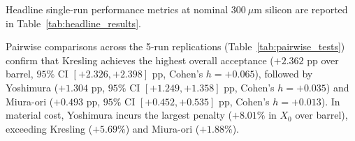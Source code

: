 \documentclass[a4paper,11pt]{article}
\begin{document}
Headline single-run performance metrics at nominal $300\ \mu\text{m}$ silicon are reported in Table~\ref{tab:headline_results}.

\begin{table}[!htbp]
\centering
\caption{Single-run exploratory performance metrics for candidate geometries ($500{,}000$ primaries each). Multi-run replication ground-truth means and uncertainties are reported in Table~\ref{tab:multirun_results}.}
\label{tab:headline_results}
\smallskip
{}
\end{table}

Pairwise comparisons across the 5-run replications (Table~\ref{tab:pairwise_tests}) confirm that Kresling achieves the highest overall acceptance ($+2.362$ pp over barrel, $95\%$ CI $[+2.326, +2.398]$ pp, Cohen's $h = +0.065$), followed by Yoshimura ($+1.304$ pp, $95\%$ CI $[+1.249, +1.358]$ pp, Cohen's $h = +0.035$) and Miura-ori ($+0.493$ pp, $95\%$ CI $[+0.452, +0.535]$ pp, Cohen's $h = +0.013$). In material cost, Yoshimura incurs the largest penalty ($+8.01\%$ in $X_0$ over barrel), exceeding Kresling ($+5.69\%$) and Miura-ori ($+1.88\%$).
\end{document}
